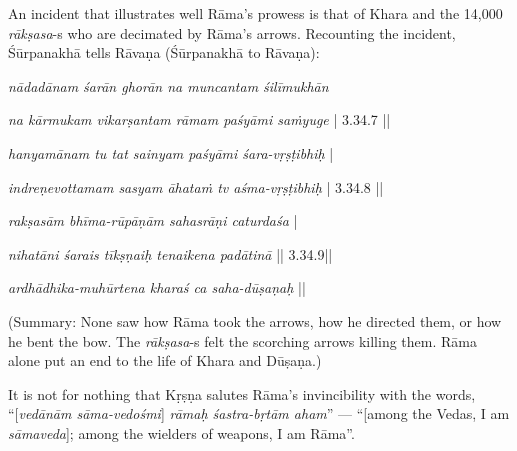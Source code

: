 An incident that illustrates well Rāma’s prowess is that of Khara and the 14,000 {\sl rākṣasa}-s who are decimated by Rāma’s arrows. Recounting the incident, Śūrpanakhā tells Rāvaṇa (Śūrpanakhā to Rāvaṇa): 

\begin{myquote}
{{\sl nādadānam śarān ghorān na muncantam śilīmukhān}}

{\sl na kārmukam vikarṣantam rāmam paśyāmi saṁyuge} | 3.34.7 ||

{\sl hanyamānam tu tat sainyam paśyāmi śara-vṛṣṭibhiḥ} |

{\sl indreṇevottamam sasyam āhataṁ tv aśma-vṛṣṭibhiḥ} | 3.34.8 ||

{\sl rakṣasām bhīma-rūpāṇām sahasrāṇi caturdaśa} |

{\sl nihatāni śarais tīkṣṇaiḥ tenaikena padātinā} || 3.34.9||

{\sl ardhādhika-muhūrtena kharaś ca saha-dūṣaṇaḥ} ||

(Summary: None saw how Rāma took the arrows, how he directed them, or how he bent the bow. The {\sl rākṣasa}-s felt the scorching arrows killing them. Rāma alone put an end to the life of Khara and Dūṣaṇa.)  
\end{myquote}

It is not for nothing that Kṛṣṇa salutes Rāma’s invincibility with the words, “[{\sl vedānām sāma-vedośmi}] {\sl rāmaḥ śastra-bṛtām aham}” --- “[among the Vedas, I am {\sl sāmaveda}]; among the wielders of weapons, I am Rāma”. 

\newpage

